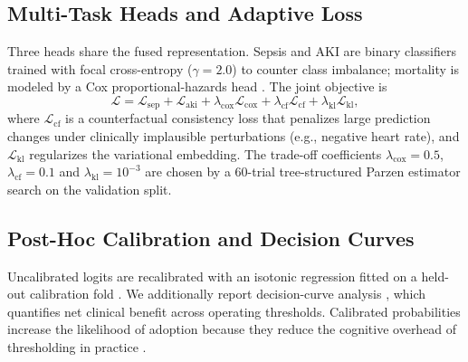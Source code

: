 \documentclass[conference]{IEEEtran}
\begin{document}
\subsection{Multi-Task Heads and Adaptive Loss}
Three heads share the fused representation. Sepsis and AKI are binary classifiers trained with focal cross-entropy \cite{lin2017focal} ($\gamma=2.0$) to counter class imbalance; mortality is modeled by a Cox proportional-hazards head \cite{katzman2018deepsurv}. The joint objective is
\begin{equation}
\mathcal{L}=\mathcal{L}_{\mathrm{sep}}+\mathcal{L}_{\mathrm{aki}}+\lambda_{\mathrm{cox}}\mathcal{L}_{\mathrm{cox}}+\lambda_{\mathrm{cf}}\mathcal{L}_{\mathrm{cf}}+\lambda_{\mathrm{kl}}\mathcal{L}_{\mathrm{kl}},
\label{eq:loss}
\end{equation}
where $\mathcal{L}_{\mathrm{cf}}$ is a counterfactual consistency loss that penalizes large prediction changes under clinically implausible perturbations (e.g., negative heart rate), and $\mathcal{L}_{\mathrm{kl}}$ regularizes the variational embedding. The trade-off coefficients $\lambda_{\mathrm{cox}}=0.5$, $\lambda_{\mathrm{cf}}=0.1$ and $\lambda_{\mathrm{kl}}=10^{-3}$ are chosen by a 60-trial tree-structured Parzen estimator search \cite{bergstra2011} on the validation split.

\subsection{Post-Hoc Calibration and Decision Curves}
Uncalibrated logits are recalibrated with an isotonic regression fitted on a held-out calibration fold \cite{guo2017}. We additionally report decision-curve analysis \cite{vickers2006}, which quantifies net clinical benefit across operating thresholds. Calibrated probabilities increase the likelihood of adoption because they reduce the cognitive overhead of thresholding in practice \cite{vancalster2019}.
\end{document}
